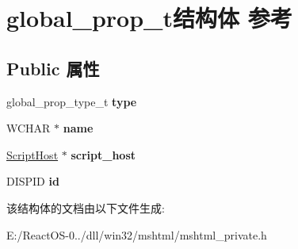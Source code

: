 \hypertarget{structglobal__prop__t}{}\section{global\+\_\+prop\+\_\+t结构体 参考}
\label{structglobal__prop__t}
\subsection*{Public 属性}
\begin{DoxyCompactItemize}
\item 
\mbox{\label{structglobal__prop__t_a711178f1a4bf12d3923fa3e485ec54d0}} 
global\+\_\+prop\+\_\+type\+\_\+t {\bfseries type}
\item 
\mbox{\label{structglobal__prop__t_a988e5324b97661f2f0ae953308b11160}} 
W\+C\+H\+AR $\ast$ {\bfseries name}
\item 
\mbox{\label{structglobal__prop__t_ae2b31238afcbc47969634feeebd2f696}} 
\hyperlink{struct_script_host}{Script\+Host} $\ast$ {\bfseries script\+\_\+host}
\item 
\mbox{\label{structglobal__prop__t_af738979e0d0261285e9069ce95e1fde0}} 
D\+I\+S\+P\+ID {\bfseries id}
\end{DoxyCompactItemize}


该结构体的文档由以下文件生成\+:\begin{DoxyCompactItemize}
\item 
E\+:/\+React\+O\+S-\/0../dll/win32/mshtml/mshtml\+\_\+private.\+h\end{DoxyCompactItemize}
